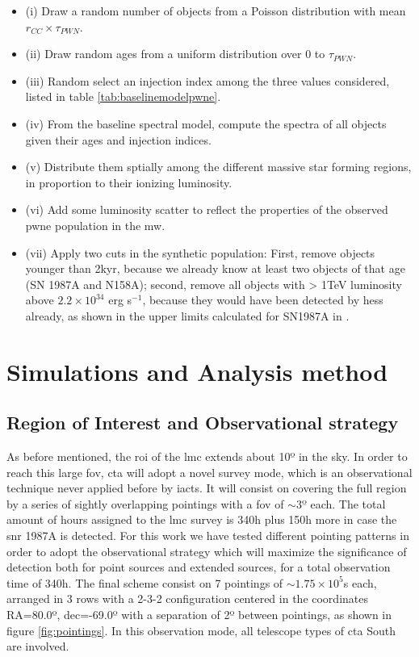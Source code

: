 \documentclass[main.tex]{subfiles}
\begin{document}
\begin{itemize}
\item (i) Draw a random number of objects from a Poisson distribution with mean $r_{CC} \times \tau_{PWN}$.
\item (ii) Draw random ages from a uniform distribution over 0 to $\tau_{PWN}$.
\item(iii) Random select an injection index among the three values considered, listed in table \ref{tab:baselinemodelpwne}.
\item (iv) From the baseline spectral model, compute the spectra of all objects given their ages and injection indices.
\item (v) Distribute them sptially among the different massive star forming regions, in proportion to their ionizing luminosity.
\item(vi) Add some luminosity scatter to reflect the properties of the observed \gls{pwne} population in the \gls{mw}.
  \item(vii) Apply two cuts in the synthetic population: First, remove objects younger than 2kyr, because we already know at least two objects of that age (SN 1987A and N158A); second, remove all objects with > 1TeV luminosity above $2.2 \times 10^{34}$ erg s$^{-1}$, because they would have been detected by \gls{hess} already, as shown in the upper limits calculated for SN1987A in \cite{2012HESSLMC}. 
\end{itemize}

\section{Simulations and Analysis method} \label{sec:simana}

\subsection{Region of Interest and Observational strategy}

As before mentioned, the  \gls{roi} of the \gls{lmc} extends about 10º in the sky. In order to reach this large \gls{fov}, \gls{cta} will adopt a novel survey mode, which is an observational technique never applied before by \glspl{iact}. It will consist on covering the full region by a series of sightly overlapping pointings with a \gls{fov} of $\sim 3º$ each. The total amount of hours assigned to the \gls{lmc} survey is 340h plus 150h more in case the \gls{snr} 1987A is detected. For this work we have tested different pointing patterns in order to adopt the observational strategy which will maximize the significance of detection both for point sources and extended sources, for a total observation time of 340h. The final scheme consist on 7 pointings of $\sim 1.75 \times 10^5$s each, arranged in 3 rows with a 2-3-2 configuration centered in the coordinates RA=80.0º, dec=-69.0º with a separation of 2º between pointings, as shown in figure \ref{fig:pointings}. In this observation mode, all telescope types of \gls{cta} South are involved.
\end{document}
